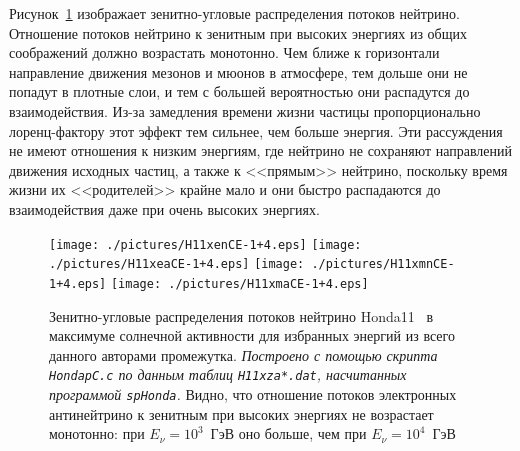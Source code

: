 \clearpage
Рисунок~\ref{Honda11maxCE-1+4} изображает зенитно-угловые распределения потоков нейтрино. \textsf{Отношение потоков нейтрино к зенитным при высоких энергиях из общих соображений должно возрастать монотонно. Чем ближе к горизонтали направление движения мезонов и мюонов в атмосфере, тем дольше они не попадут в плотные слои, и тем с большей вероятностью они распадутся до взаимодействия. Из-за замедления времени жизни частицы пропорционально лоренц-фактору этот эффект тем сильнее, чем больше энергия. Эти рассуждения не имеют отношения к низким энергиям, где нейтрино не сохраняют направлений движения исходных частиц, а также к <<прямым>> нейтрино, поскольку время жизни их <<родителей>> крайне мало и они быстро распадаются до взаимодействия даже при очень высоких энергиях.} 
\begin{figure}[!ht]
\texttt{[image: ./pictures/H11xenCE-1+4.eps]}
\texttt{[image: ./pictures/H11xeaCE-1+4.eps]}
\texttt{[image: ./pictures/H11xmnCE-1+4.eps]}
\texttt{[image: ./pictures/H11xmaCE-1+4.eps]}
\caption{Зенитно-угловые распределения потоков нейтрино Honda11~\cite{Honda:2011nf} в максимуме солнечной активности для избранных энергий из всего данного авторами промежутка. \textit{Построено с помощью скрипта \texttt{HondapC.c} по данным таблиц \texttt{H11xza*.dat}, насчитанных программой \texttt{spHonda}.} Видно, что отношение потоков электронных антинейтрино к зенитным при высоких энергиях не возрастает монотонно: при $E_{\nu}=10^{3}$~ГэВ оно больше, чем при $E_{\nu}=10^{4}$~ГэВ}
\label{Honda11maxCE-1+4}
\end{figure}

